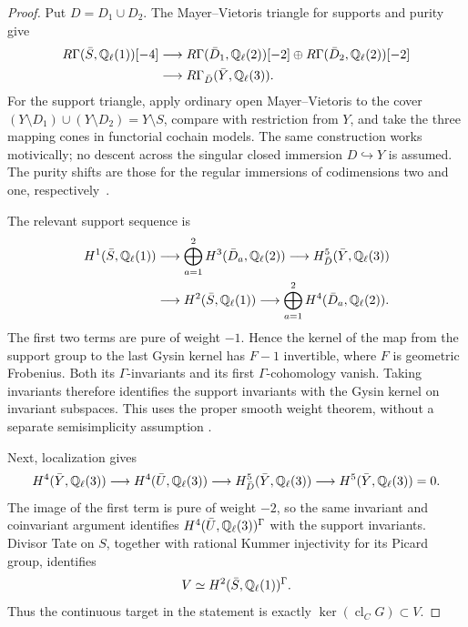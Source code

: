 \begin{proof}
Put \(D=D_1\cup D_2\).  The Mayer--Vietoris triangle for
supports and purity give
\[
\begin{split}
 R\Gamma(\bar S,\mathbb Q_\ell(1))[-4]
   &\longrightarrow
      R\Gamma(\bar D_1,\mathbb Q_\ell(2))[-2]
        \oplus R\Gamma(\bar D_2,\mathbb Q_\ell(2))[-2]\\
   &\longrightarrow R\Gamma_{\bar D}(\bar Y,\mathbb Q_\ell(3)).
\end{split}
\]
For the support triangle, apply ordinary open Mayer--Vietoris
to the cover
\((Y\setminus D_1)\cup(Y\setminus D_2)=Y\setminus S\),
compare with restriction from \(Y\), and take the three
mapping cones in functorial cochain models.  The same construction
works motivically; no descent across the singular closed immersion
\(D\hookrightarrow Y\) is assumed.  The purity shifts are those
for the regular immersions of codimensions two and one,
respectively~\cite[Theorem~3.1.1, p.~323]{c_riou2014}.

The relevant support sequence is
\[
\begin{aligned}
 H^1(\bar S,\mathbb Q_\ell(1))
 &\longrightarrow\bigoplus_{a=1}^2H^3(\bar D_a,\mathbb Q_\ell(2))
 \longrightarrow H^5_{\bar D}(\bar Y,\mathbb Q_\ell(3))\\
 &\longrightarrow H^2(\bar S,\mathbb Q_\ell(1))
 \longrightarrow\bigoplus_{a=1}^2H^4(\bar D_a,\mathbb Q_\ell(2)).
\end{aligned}
\]
The first two terms are pure of weight \(-1\).  Hence the
kernel of the map from the support group to the last Gysin
kernel has \(F-1\) invertible, where \(F\) is geometric
Frobenius.  Both its \(\Gamma\)-invariants and its first
\(\Gamma\)-cohomology vanish.  Taking invariants therefore
identifies the support invariants with the Gysin kernel on
invariant subspaces.  This uses the proper smooth weight
theorem, without a separate semisimplicity assumption
\cite[Corollary~3.3.9, p.~207]{c_deligneweil1980}.

Next, localization gives
\[
 H^4(\bar Y,\mathbb Q_\ell(3))\longrightarrow
 H^4(\bar U,\mathbb Q_\ell(3))\longrightarrow
 H^5_{\bar D}(\bar Y,\mathbb Q_\ell(3))\longrightarrow
 H^5(\bar Y,\mathbb Q_\ell(3))=0.
\]
The image of the first term is pure of weight \(-2\), so
the same invariant and coinvariant argument identifies
\(H^4(\bar U,\mathbb Q_\ell(3))^\Gamma\) with the support
invariants.  Divisor Tate on \(S\), together with rational
Kummer injectivity for its Picard group, identifies
\[
 V\simeq H^2(\bar S,\mathbb Q_\ell(1))^\Gamma.
\]
Thus the continuous target in the statement is exactly
\(\ker(\operatorname{cl}_C G)\subset V\).


\end{proof}
